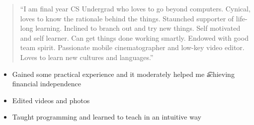 \documentclass[10pt,a4paper,ragged2e,withhyper]{altacv}
\begin{document}
\begin{paracol}{2}

\begin{quote}
“I am final year CS Undergrad who loves to go beyond computers. Cynical, loves to know the rationale behind the things. Staunched supporter of life-long learning. Inclined to branch out and try new things. Self motivated and self learner. Can get things done working smartly. Endowed with good team spirit. Passionate mobile cinematographer and low-key video editor. Loves to learn new cultures and languages.”
\end{quote}



\divider
{}
\divider
{}



\begin{itemize}
\item Gained some practical experience and it moderately helped me \t achieving financial independence
\item Edited videos and photos
\item Taught programming and learned to teach in an intuitive way
\end{itemize}

\divider



\end{paracol}
\end{document}
